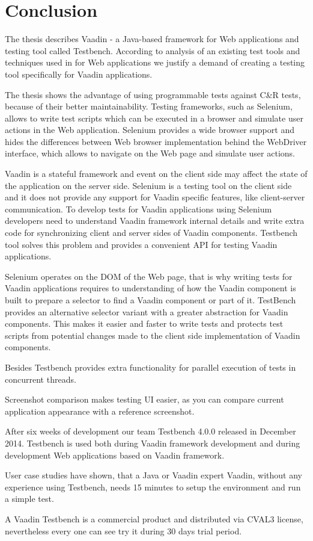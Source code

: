\chapter {Conclusion}
\label{ch:conclusion}
 The thesis describes Vaadin - a Java-based framework for Web applications and
testing tool called Testbench.
 According to analysis of an existing test tools and techniques used in for Web
applications we justify a demand of creating a testing tool specifically
for Vaadin applications. 

The thesis shows the advantage of using programmable tests against C\&R tests,
because of their better maintainability. Testing frameworks, such as Selenium,
allows to write test scripts which can be executed in a browser and simulate
user actions in the Web application. Selenium provides a wide browser support
and hides the differences between Web browser implementation behind the
WebDriver interface, which allows to navigate on the Web page and simulate user
actions.

Vaadin is a stateful framework and event on the client side may affect the state
of the application on the server side. Selenium is a testing tool on the client
side and it does not provide any support for Vaadin specific features, like
client-server communication. To develop tests for Vaadin applications using
Selenium developers need to understand Vaadin framework internal details and 
write extra code for synchronizing client and server sides of Vaadin components.
Testbench tool solves this problem and provides a convenient API for testing Vaadin applications.

Selenium operates on the DOM of the Web page, that is why writing tests for
Vaadin applications requires to understanding of how the Vaadin component is
built to prepare a selector to find a Vaadin component or part of it. TestBench
provides an alternative selector variant with a greater abstraction for Vaadin components.
This makes it easier and faster to write tests and protects test scripts from potential
changes made to the client side implementation of Vaadin components.

Besides Testbench provides extra functionality for parallel execution of
tests in concurrent threads. 

Screenshot comparison makes testing UI easier,
as you can compare current application appearance with a reference screenshot.

After six weeks of development our team Testbench 4.0.0 released in December
2014. Testbench is used both during Vaadin framework development and during
development Web applications based on Vaadin framework.

 User case studies have shown, that a Java or Vaadin expert Vaadin,
 without any experience using Testbench, needs 15 minutes to setup the
 environment and run a simple test.
 
 A Vaadin Testbench is a commercial product and distributed via CVAL3 license,
 nevertheless every one can see try it during 30 days trial period.